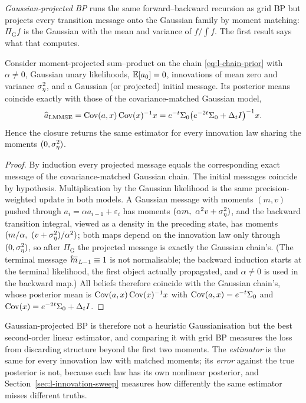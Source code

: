 \emph{Gaussian-projected BP} runs the same forward--backward recursion as
grid BP but projects every transition message onto the Gaussian family by
moment matching: $\Pi_{\mathrm G} f$ is the Gaussian with the mean and
variance of $f/\!\int f$. The first result says what that computes.

\begin{theorem}
\label{thm:l-lmmse}
Consider moment-projected sum--product on the chain
\eqref{eq:l-chain-prior} with $\alpha \ne 0$, Gaussian unary likelihoods,
$\mathbb{E}[a_0] = 0$, innovations of mean zero and variance $\sigma_\eta^2$, and a Gaussian
(or projected) initial message. Its posterior means coincide exactly with
those of the covariance-matched Gaussian model,
\begin{equation}
  \widehat a_{\mathrm{LMMSE}}
  = \operatorname{Cov}(a,x)\operatorname{Cov}(x)^{-1}x
  = e^{-t}\Sigma_0 \bigl(e^{-2t}\Sigma_0+\Delta_t I\bigr)^{-1}x .
  \label{eq:l-lmmse}
\end{equation}
Hence the closure returns the same estimator for every innovation law sharing
the moments $(0,\sigma_\eta^2)$.
\end{theorem}

\begin{proof}
By induction every projected message equals the corresponding exact message
of the covariance-matched Gaussian chain. The initial messages coincide by
hypothesis. Multiplication by the Gaussian likelihood is the same
precision-weighted update in both models. A Gaussian message with moments
$(m, v)$ pushed through $a_i = \alpha a_{i-1} + \varepsilon_i$ has moments
$(\alpha m,\ \alpha^2 v + \sigma_\eta^2)$, and the backward transition integral,
viewed as a density in the preceding state, has moments
$(m/\alpha,\ (v + \sigma_\eta^2)/\alpha^2)$; both maps depend on the innovation law
only through $(0, \sigma_\eta^2)$, so after $\Pi_{\mathrm G}$ the projected message is
exactly the Gaussian chain's. (The terminal message $\overleftarrow{m}_{L-1} \equiv 1$
is not normalisable; the backward induction starts at the terminal likelihood,
the first object actually propagated, and $\alpha \ne 0$ is used in the
backward map.) All beliefs therefore coincide with the Gaussian chain's, whose
posterior mean is $\operatorname{Cov}(a,x)\operatorname{Cov}(x)^{-1}x$ with $\operatorname{Cov}(a,x) = e^{-t}\Sigma_0$ and
$\operatorname{Cov}(x) = e^{-2t}\Sigma_0 + \Delta_t I$.
\end{proof}

Gaussian-projected BP is therefore not a heuristic Gaussianisation but the
best second-order linear estimator, and comparing it with grid BP measures
the loss from discarding structure beyond the first two moments. The
\emph{estimator} is the same for every innovation law with matched moments;
its \emph{error} against the true posterior is not, because each law has its
own nonlinear posterior, and Section~\ref{sec:l-innovation-sweep} measures how
differently the same estimator misses different truths.

